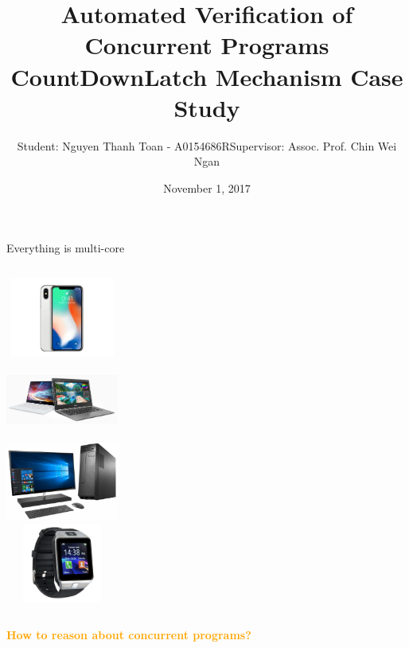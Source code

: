 \documentclass[11pt]{beamer}
\title[QE Presentation]{\normalsize Automated Verification of Concurrent
  Programs\\ CountDownLatch Mechanism Case Study}
\author[Nguyen Thanh Toan]{Student: Nguyen Thanh Toan - A0154686R\newline Supervisor: Assoc. Prof. Chin Wei Ngan}
\institute[]{National University of Singapore}
\date{November 1, 2017}
\newcommand\orange[1]{\textcolor{orange}{\textbf{#1}}}
\begin{document}
\begin{frame}
  \titlepage
\end{frame}

\begin{frame}{Everything is multi-core}
	\begin{columns}[t]
		\centering
		\includegraphics[width=10em,height=7em]{./images/iphone.jpg}\\
		\includegraphics[width=10em,height=7em]{./images/lg-gram.jpg}\\
		\centering
		\includegraphics[width=10em,height=7em]{./images/desktop.jpg}\\
		\includegraphics[width=10em,height=7em]{./images/watch.jpg}
	\end{columns}
\end{frame}

\begin{frame}{}
  \begin{center}
    \orange{How to reason about concurrent programs?}
  \end{center}
\end{frame}
\end{document}
